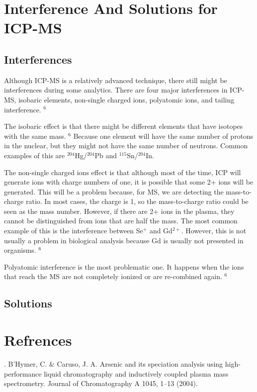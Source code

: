 \documentclass[12pt]{article}
\begin{document}
\section{Interference And Solutions for ICP-MS}
\subsection{Interferences}
Although ICP-MS is a relatively advanced technique, there still might be interferences during some analytics.
There are four major interferences in ICP-MS, isobaric elements, non-single charged ions, polyatomic ions, and tailing interference. $^6$ 

The isobaric effect is that there might be different elements that have isotopes with the same mass. $^6$ Because one element will have the same number of protons in the nuclear, but they might not have the same number of neutrons. Common examples of this are  $^{204}$Hg/$^{204}$Pb and $^{115}$Sn/$^{204}$In.

The non-single charged ions effect is that although most of the time, ICP will generate ions with charge numbers of one, it is possible that some 2+ ions will be generated. This will be a problem because, for MS, we are detecting the mass-to-charge ratio. In most cases, the charge is 1, so the mass-to-charge ratio could be seen as the mass number. However, if there are 2+ ions in the plasma, they cannot be distinguished from ions that are half the mass. The most common example of this is the interference between Se$^+$ and Gd$^{2+}$. However, this is not usually a problem in biological analysis because Gd is usually not presented in organisms. $^6$

Polyatomic interference is the most problematic one. It happens when the ions that reach the MS are not completely ionized or are re-combined again. $^6$ 
\subsection{Solutions} 


\section{Refrences}
. B’Hymer, C. \& Caruso, J. A. Arsenic and its speciation analysis using high-performance liquid chromatography and inductively coupled plasma mass spectrometry. Journal of Chromatography A 1045, 1–13 (2004).
\end{document}
